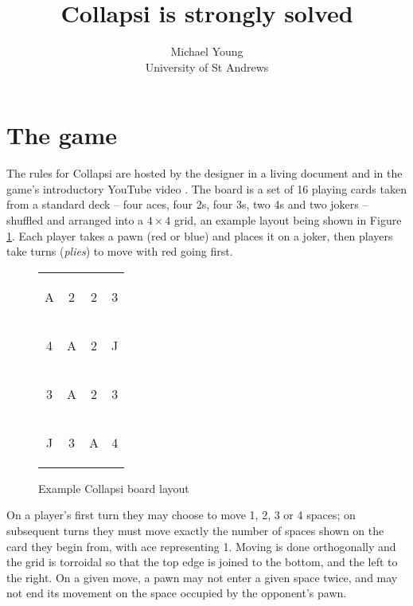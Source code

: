\documentclass[a4paper, twocolumn]{article}
\title{Collapsi is strongly solved}
\author{Michael Young\\University of St Andrews}
\newcommand\card[1]{\begin{tcolorbox}#1\end{tcolorbox}}
\newcommand\board[8]{
  \begin{tabular}{c c c c}
    \card{#1} & \card{#2} & \card{#3} & \card{#4} \\
    \card{#5} & \card{#6} & \card{#7} & \card{#8} \\
    \restofboard
}
\newcommand\restofboard[8]{
    \card{#1} & \card{#2} & \card{#3} & \card{#4} \\
    \card{#5} & \card{#6} & \card{#7} & \card{#8}
  \end{tabular}
}
\begin{document}
\maketitle



\section{The game}

The rules for Collapsi are hosted by the designer in a living document
\cite{rules} and in the game's introductory YouTube video \cite{youtube}. The
board is a set of 16 playing cards taken from a standard deck -- four aces, four
2s, four 3s, two 4s and two jokers -- shuffled and arranged into a $4\times 4$
grid, an example layout being shown in Figure \ref{fig:board}. Each player takes
a pawn (red or blue) and places it on a joker, then players take turns
(\textit{plies}) to move with red going first.

\begin{figure}[ht]
  \centering
  \board A223 4A2J 3A23 J3A4
  \caption{Example Collapsi board layout}
  \label{fig:board}
\end{figure}

On a player's first turn they may choose to move 1, 2, 3 or 4 spaces; on
subsequent turns they must move exactly the number of spaces shown on the card
they begin from, with ace representing 1. Moving is done orthogonally and the
grid is torroidal so that the top edge is joined to the bottom, and the left to
the right. On a given move, a pawn may not enter a given space twice, and may
not end its movement on the space occupied by the opponent's pawn.
\end{document}
